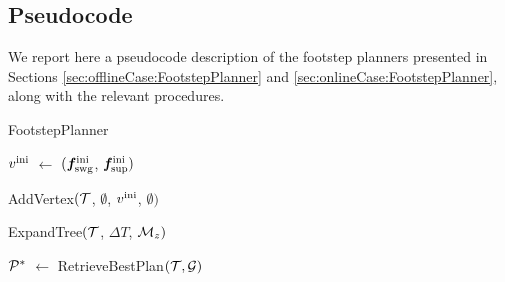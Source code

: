 \subsection{Pseudocode}
\label{sec:Pseudocode}
  
We report here a pseudocode description of the footstep planners presented in Sections \ref{sec:offlineCase:FootstepPlanner} and \ref{sec:onlineCase:FootstepPlanner}, along with the relevant procedures. 

\begin{algorithm}%
	\small
	\removelatexerror
	\label{alg:FootstepPlanner}
	
	\caption{FootstepPlanner}
	\vspace{2pt}
    \BlankLine
    
	$v^{\rm ini}$ $\leftarrow$ $({{\bm{f}}}_{\rm swg}^{\rm ini}$, ${{\bm{f}}}_{\rm sup}^{\rm ini})$\; 
	
	AddVertex$(\cal T$, $\emptyset$, $v^{\rm ini}$, $\emptyset)$\;
	
	ExpandTree$(\cal T$, ${\Delta T}$, ${\cal M}_z)$\;
	
    ${\cal P}^*$ $\leftarrow$ RetrieveBestPlan$({\cal T}, {\cal G})$\;	
    \;
\end{algorithm}

